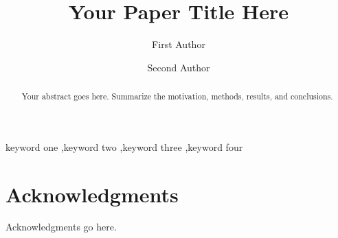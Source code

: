 \documentclass[preprint]{elsarticle}
\begin{document}
\begin{frontmatter}
\title{Your Paper Title Here}

\author[1]{First Author}
\author[1]{Second Author}




\begin{abstract}
Your abstract goes here. Summarize the motivation, methods, results, and conclusions.
\end{abstract}

\begin{keyword}
keyword one \sep keyword two \sep keyword three \sep keyword four
\end{keyword}

\end{frontmatter}










% 


\section*{Acknowledgments}

Acknowledgments go here.




\end{document}
